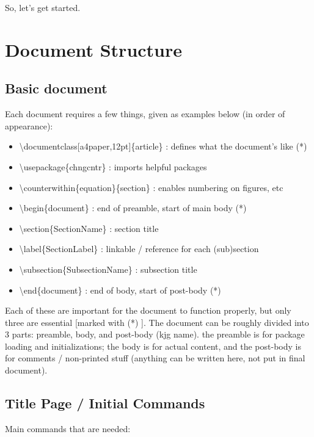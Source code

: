 So, let's get started. 

\section{Document Structure} \label{Document Structure}
\subsection{Basic document} \label {Basic document}
Each document requires a few things, given as examples below (in order of appearance): 

\begin{itemize}
\itemsep=-0.5em
\item \textbackslash documentclass[a4paper,12pt]\{article\} : defines what the document's like (*)
\item \textbackslash usepackage\{chngcntr\}                 : imports helpful packages
\item \textbackslash counterwithin\{equation\}\{section\}   : enables numbering on figures, etc
\item \textbackslash begin\{document\}                      : end of preamble, start of main body (*)
\item \textbackslash section\{SectionName\}                 : section title
\item \textbackslash label\{SectionLabel\}                  : linkable / reference for each (sub)section
\item \textbackslash subsection\{SubsectionName\}           : subsection title
\item \textbackslash end\{document\}                        : end of body, start of post-body (*)
\end{itemize}

Each of these are important for the document to function properly, but only three are essential [marked with (*) ]. The document can be roughly divided into 3 parts: preamble, body, and post-body (kjg name). the preamble is for package loading and initializations; the body is for actual content, and the post-body is for comments / non-printed stuff (anything can be written here, not put in final document).

\subsection{Title Page / Initial Commands}
Main commands that are needed: 

